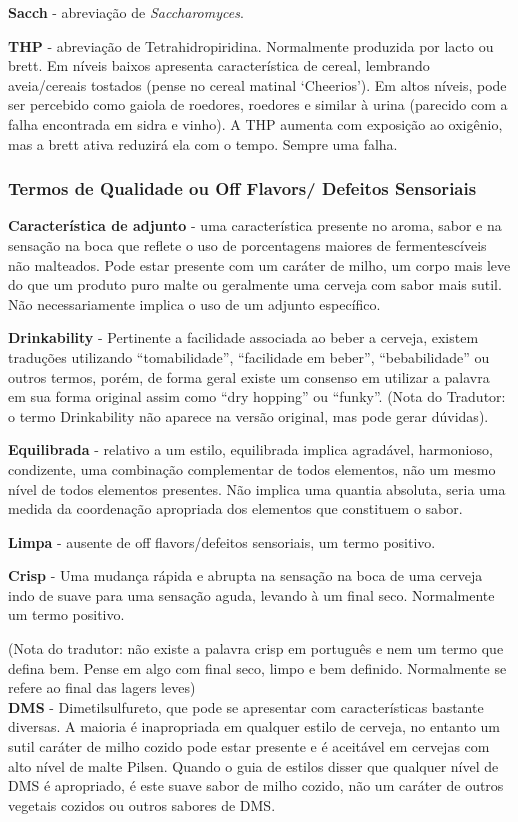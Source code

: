 \textbf{Sacch} - abreviação de \textit{Saccharomyces}.

\textbf{THP} - abreviação de Tetrahidropiridina. Normalmente produzida por lacto ou brett. Em níveis baixos apresenta característica de cereal, lembrando aveia/cereais tostados (pense no cereal matinal ‘Cheerios’). Em altos níveis, pode ser percebido como gaiola de roedores, roedores e similar à urina (parecido com a falha encontrada em sidra e vinho). A THP aumenta com exposição ao oxigênio, mas a brett ativa reduzirá ela com o tempo. Sempre uma falha.
\subsubsection*{Termos de Qualidade ou Off Flavors/ Defeitos Sensoriais}
\textbf{Característica de adjunto} - uma característica presente no aroma, sabor e na sensação na boca que reflete o uso de porcentagens maiores de fermentescíveis não malteados.  Pode estar presente com um caráter de milho, um corpo mais leve do que um produto puro malte ou geralmente uma cerveja com sabor mais sutil. Não necessariamente implica o uso de um adjunto específico.

\textbf{Drinkability} - Pertinente a facilidade associada ao beber a cerveja, existem traduções utilizando “tomabilidade”, “facilidade em beber”, “bebabilidade” ou outros termos, porém, de forma geral existe um consenso em utilizar a palavra em sua forma original assim como “dry hopping” ou “funky”. (Nota do Tradutor: o termo Drinkability não aparece na versão original, mas pode gerar dúvidas).

\textbf{Equilibrada} - relativo a um estilo, equilibrada implica agradável, harmonioso, condizente, uma combinação complementar de todos elementos, não um mesmo nível de todos elementos presentes. Não implica uma quantia absoluta, seria uma medida da coordenação apropriada dos elementos que constituem o sabor.

\textbf{Limpa} - ausente de off flavors/defeitos sensoriais, um termo positivo.

\textbf{Crisp} - Uma mudança rápida e abrupta na sensação na boca de uma cerveja indo de suave para uma sensação aguda, levando à um final seco. Normalmente um termo positivo.

(Nota do tradutor: não existe a palavra crisp em português e nem um termo que defina bem. Pense em algo com final seco, limpo e bem definido. Normalmente se refere ao final das lagers leves)\\
\textbf{DMS} - Dimetilsulfureto, que pode se apresentar com características bastante diversas. A maioria é inapropriada em qualquer estilo de cerveja, no entanto um sutil caráter de milho cozido pode estar presente e é aceitável em cervejas com alto nível de malte Pilsen. Quando o guia de estilos disser que qualquer nível de DMS é apropriado, é este suave sabor de milho cozido, não um caráter de outros vegetais cozidos ou outros sabores de DMS.

